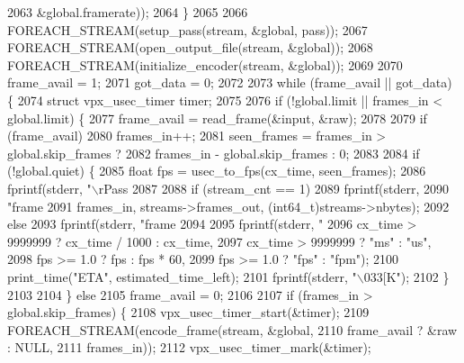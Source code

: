 \begin{DoxyCodeInclude}
{{{{{{{{{{{{{{{{{{{{{{{{{{{{{{{{{{{{{{{{{{{{{{{{{{{{{{{{{{{{{{2063                                          &global.framerate));
2064     \}
2065 
2066     FOREACH\_STREAM(setup\_pass(stream, &global, pass));
2067     FOREACH\_STREAM(open\_output\_file(stream, &global));
2068     FOREACH\_STREAM(initialize\_encoder(stream, &global));
2069 
2070     frame\_avail = 1;
2071     got\_data = 0;
2072 
2073     \textcolor{keywordflow}{while} (frame\_avail || got\_data) \{
2074       \textcolor{keyword}{struct }vpx\_usec\_timer timer;
2075 
2076       \textcolor{keywordflow}{if} (!global.limit || frames\_in < global.limit) \{
2077         frame\_avail = read\_frame(&input, &raw);
2078 
2079         \textcolor{keywordflow}{if} (frame\_avail)
2080           frames\_in++;
2081         seen\_frames = frames\_in > global.skip\_frames ?
2082                           frames\_in - global.skip\_frames : 0;
2083 
2084         \textcolor{keywordflow}{if} (!global.quiet) \{
2085           \textcolor{keywordtype}{float} fps = usec\_to\_fps(cx\_time, seen\_frames);
2086           fprintf(stderr, \textcolor{stringliteral}{"\(\backslash\)rPass %
2087 
2088           \textcolor{keywordflow}{if} (stream\_cnt == 1)
2089             fprintf(stderr,
2090                     \textcolor{stringliteral}{"frame %
2091                     frames\_in, streams->frames\_out, (int64\_t)streams->nbytes);
2092           \textcolor{keywordflow}{else}
2093             fprintf(stderr, \textcolor{stringliteral}{"frame %
2094 
2095           fprintf(stderr, \textcolor{stringliteral}{"%
2096                   cx\_time > 9999999 ? cx\_time / 1000 : cx\_time,
2097                   cx\_time > 9999999 ? \textcolor{stringliteral}{"ms"} : \textcolor{stringliteral}{"us"},
2098                   fps >= 1.0 ? fps : fps * 60,
2099                   fps >= 1.0 ? \textcolor{stringliteral}{"fps"} : \textcolor{stringliteral}{"fpm"});
2100           print\_time(\textcolor{stringliteral}{"ETA"}, estimated\_time\_left);
2101           fprintf(stderr, \textcolor{stringliteral}{"\(\backslash\)033[K"});
2102         \}
2103 
2104       \} \textcolor{keywordflow}{else}
2105         frame\_avail = 0;
2106 
2107       \textcolor{keywordflow}{if} (frames\_in > global.skip\_frames) \{
2108         vpx\_usec\_timer\_start(&timer);
2109         FOREACH\_STREAM(encode\_frame(stream, &global,
2110                                     frame\_avail ? &raw : NULL,
2111                                     frames\_in));
2112         vpx\_usec\_timer\_mark(&timer);
}}}}}}}}}}}}}}}}}}}}}}}}}}}}}}}}}}}}}}}}}}}}}}}}}}}}}}}}}}}}}}}}}}
\end{DoxyCodeInclude}

